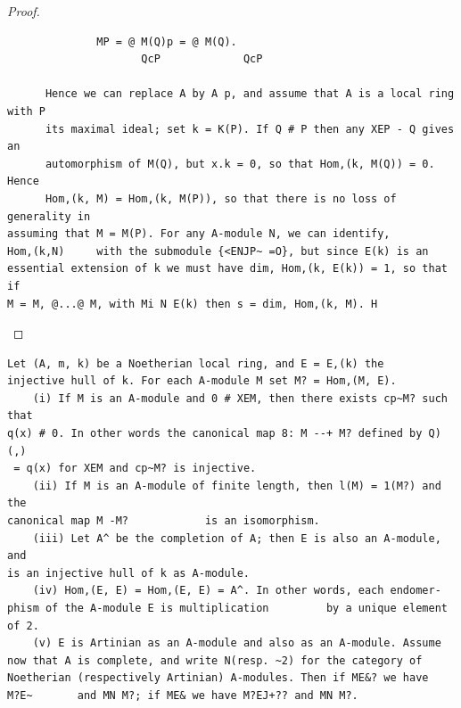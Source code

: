 \begin{proof}
\begin{verbatim}
              MP = @ M(Q)p = @ M(Q).
                     QcP             QcP

      Hence we can replace A by A p, and assume that A is a local ring with P
      its maximal ideal; set k = K(P). If Q # P then any XEP - Q gives an
      automorphism of M(Q), but x.k = 0, so that Hom,(k, M(Q)) = 0. Hence
      Hom,(k, M) = Hom,(k, M(P)), so that there is no loss of generality in
assuming that M = M(P). For any A-module N, we can identify,
Hom,(k,N)     with the submodule {<ENJP~ =O}, but since E(k) is an
essential extension of k we must have dim, Hom,(k, E(k)) = 1, so that if
M = M, @...@ M, with Mi N E(k) then s = dim, Hom,(k, M). H
\end{verbatim}
\end{proof}


\begin{theorem}\label{mcrt-auto-theorem-18-6}\uses{}
\begin{verbatim}
Let (A, m, k) be a Noetherian local ring, and E = E,(k) the
injective hull of k. For each A-module M set M? = Hom,(M, E).
    (i) If M is an A-module and 0 # XEM, then there exists cp~M? such that
q(x) # 0. In other words the canonical map 8: M --+ M? defined by Q)(,)
 = q(x) for XEM and cp~M? is injective.
    (ii) If M is an A-module of finite length, then l(M) = 1(M?) and the
canonical map M -M?            is an isomorphism.
    (iii) Let A^ be the completion of A; then E is also an A-module, and
is an injective hull of k as A-module.
    (iv) Hom,(E, E) = Hom,(E, E) = A^. In other words, each endomer-
phism of the A-module E is multiplication         by a unique element of 2.
    (v) E is Artinian as an A-module and also as an A-module. Assume
now that A is complete, and write N(resp. ~2) for the category of
Noetherian (respectively Artinian) A-modules. Then if ME&? we have
M?E~       and MN M?; if ME& we have M?EJ+?? and MN M?.
\end{verbatim}
\end{theorem}
